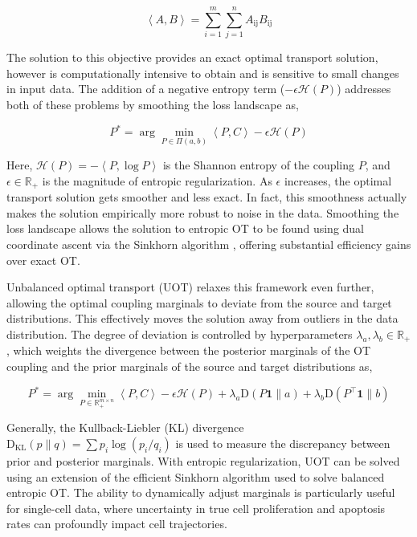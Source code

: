 \[\left\langle A,B \right\rangle = \sum_{i = 1}^{m}{\sum_{j = 1}^{n}A_{\text{ij}}}B_{\text{ij}}\]

The solution to this objective provides an exact optimal transport solution, however is computationally intensive to obtain and is sensitive to small changes in input data. The addition of a negative entropy term (\(- \epsilon\mathcal{H}(P)\)) addresses both of these problems by smoothing the loss landscape as,

\[P^{*} = \mathrm{\arg}\underset{P \in \Pi(a,b)}{\mathrm{\min}}\left\langle P,C \right\rangle - \epsilon\mathcal{H}(P)\]

Here, \(\mathcal{H}(P) = - \left\langle P,\mathrm{\log}P \right\rangle\) is the Shannon entropy of the coupling \(P\), and \(\epsilon \in \mathbb{R}_{+}\) is the magnitude of entropic regularization. As \(\epsilon\) increases, the optimal transport solution gets smoother and less exact. In fact, this smoothness actually makes the solution empirically more robust to noise in the data. Smoothing the loss landscape allows the solution to entropic OT to be found using dual coordinate ascent via the Sinkhorn algorithm \citep{cuturiSinkhornDistancesLightspeed2013a}, offering substantial efficiency gains over exact OT.

Unbalanced optimal transport (UOT) relaxes this framework even further, allowing the optimal coupling marginals to deviate from the source and target distributions. This effectively moves the solution away from outliers in the data distribution. The degree of deviation is controlled by hyperparameters \(\lambda_{a},\lambda_{b} \in \mathbb{R}_{+}\), which weights the divergence between the posterior marginals of the OT coupling and the prior marginals of the source and target distributions as,

\[P^{*} = \mathrm{\arg}\underset{P \in \mathbb{R}_{+}^{m \times n}}{\mathrm{\min}}\left\langle P,C \right\rangle - \epsilon\mathcal{H}(P) + \lambda_{a}\mathrm{D}\left( P\mathbf{1} \parallel a \right) + \lambda_{b}\mathrm{D}\left( P^{\top}\mathbf{1} \parallel b \right)\]

Generally, the Kullback-Liebler (KL) divergence \(\mathrm{D}_{\mathrm{\text{KL}}}\left( p \parallel q \right) = \sum p_{i}\mathrm{\log}(p_{i}/q_{i})\) is used to measure the discrepancy between prior and posterior marginals. With entropic regularization, UOT can be solved using an extension of the efficient Sinkhorn algorithm used to solve balanced entropic OT. The ability to dynamically adjust marginals is particularly useful for single-cell data, where uncertainty in true cell proliferation and apoptosis rates can profoundly impact cell trajectories.

